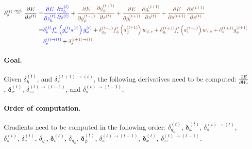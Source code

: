 \documentclass[11pt]{article}
\begin{document}
\begin{equation}
\begin{split}
    \delta_{s}^{(t)} \overset{not.}{=} \displaystyle\frac{\partial E}{\partial s^{(t)}} = &
    {\color{blue} \displaystyle\frac{\partial E}{\partial z_h^{(t)}}
    \displaystyle\frac{\partial z_h^{(t)}}{\partial s^{(t)}}} +
    {\color{auburn}\displaystyle\frac{\partial E}{\partial g_{\phi}^{(t+1)}}
    \displaystyle\frac{\partial g_{\phi}^{(t+1)}}{\partial s^{(t)}} +
    \displaystyle\frac{\partial E}{\partial g_{\iota}^{(t+1)}}
    \displaystyle\frac{\partial g_{\iota}^{(t+1)}}{\partial s^{(t)}} +
    \displaystyle\frac{\partial E}{\partial s^{(t+1)}}
    \displaystyle\frac{\partial s^{(t+1)}}{\partial s^{(t)}}} \\
    = & {\color{blue} \delta_{h}^{(t)} f_{\omega}'\left(g_{\omega}^{(t)}s^{(t)}\right) g_{\omega}^{(t)}} +
        {\color{auburn}\delta_{g_{\phi}}^{(t+1)}f_{\phi}'\left(a_{\phi}^{(t+1)}\right)w_{\phi, s} +
        \delta_{g_{\iota}}^{(t+1)}f_{\iota}'\left(a_{\iota}^{(t+1)}\right)w_{\iota, s} +
        \delta_{s}^{(t+1)}g_{\phi}^{(t+1)}} \\
    = & {\color{blue}\delta^{(t) \rightarrow (t)}_s} +
        {\color{auburn}\delta^{(t+1) \rightarrow (t)}_s}
\end{split}
\end{equation}

\paragraph{Goal.} Given $\delta_h^{(t)}$, and $\delta^{(t+1) \rightarrow (t)}_s$, the following derivatives need to be computed: $\displaystyle \frac{\partial E}{\partial W_{*}}$, $\boldsymbol{\delta}_x^{(t)}$, $\delta_{zz}^{(t)\rightarrow(t-1)}$, and $\delta^{(t) \rightarrow (t-1)}_s$.

\paragraph{Order of computation.}
Gradients need to be computed in the following order: $\delta_{g_{\omega}}^{(t)}$, $\boldsymbol{\delta}_{\omega}^{(t)}$, $\delta_s^{(t) \rightarrow (t)}$, $\delta_s^{(t)}$, $\delta_c^{(t)}$, $\delta_{g_{\iota}}$, $\boldsymbol{\delta}_{\iota}^{(t)}$, $\delta_{g_{\phi}}$, $\boldsymbol{\delta}_{\phi}^{(t)}$,
$\delta_s^{(t) \rightarrow (t-1)}$, $\boldsymbol{\delta}_x^{(t)}$, $\delta_{zz}^{(t)\rightarrow(t-1)}$.
\end{document}
